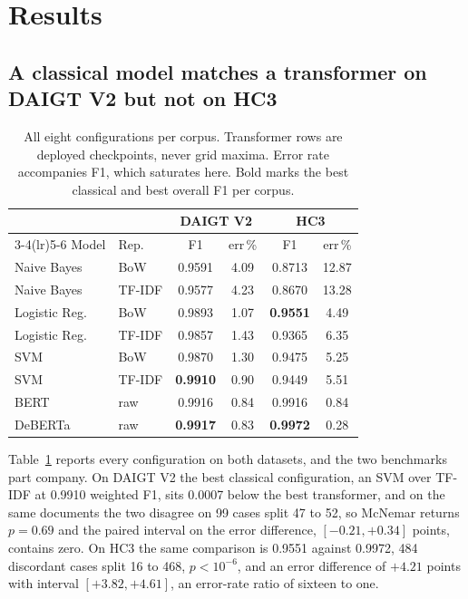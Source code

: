 \section{Results}
\label{sec:results}

\subsection{A classical model matches a transformer on DAIGT V2 but not on HC3}

\begin{table}[!ht]
\centering
\caption{All eight configurations per corpus. Transformer rows are deployed checkpoints, never grid maxima. Error rate accompanies F1, which saturates here. Bold marks the best classical and best overall F1 per corpus.}
\label{tab:allmodels}
\footnotesize
\setlength{\tabcolsep}{3.5pt}
\begin{tabular}{@{}llcccc@{}}
\toprule
& & \multicolumn{2}{c}{DAIGT V2} & \multicolumn{2}{c}{HC3} \\
\cmidrule(lr){3-4}\cmidrule(lr){5-6}
Model & Rep. & F1 & err\,\% & F1 & err\,\% \\
\midrule
Naive Bayes & BoW & 0.9591 & 4.09 & 0.8713 & 12.87 \\
Naive Bayes & TF-IDF & 0.9577 & 4.23 & 0.8670 & 13.28 \\
Logistic Reg. & BoW & 0.9893 & 1.07 & \textbf{0.9551} & 4.49 \\
Logistic Reg. & TF-IDF & 0.9857 & 1.43 & 0.9365 & 6.35 \\
SVM & BoW & 0.9870 & 1.30 & 0.9475 & 5.25 \\
SVM & TF-IDF & \textbf{0.9910} & 0.90 & 0.9449 & 5.51 \\
BERT & raw & 0.9916 & 0.84 & 0.9916 & 0.84 \\
DeBERTa & raw & \textbf{0.9917} & 0.83 & \textbf{0.9972} & 0.28 \\
\bottomrule
\end{tabular}
\end{table}

Table~\ref{tab:allmodels} reports every configuration on both datasets, and the two benchmarks part company. On DAIGT V2 the best classical configuration, an SVM over TF-IDF at 0.9910 weighted F1, sits 0.0007 below the best transformer, and on the same documents the two disagree on 99 cases split 47 to 52, so McNemar returns $p=0.69$ and the paired interval on the error difference, $[-0.21, +0.34]$ points, contains zero. On HC3 the same comparison is 0.9551 against 0.9972, 484 discordant cases split 16 to 468, $p < 10^{-6}$, and an error difference of $+4.21$ points with interval $[+3.82, +4.61]$, an error-rate ratio of sixteen to one.

